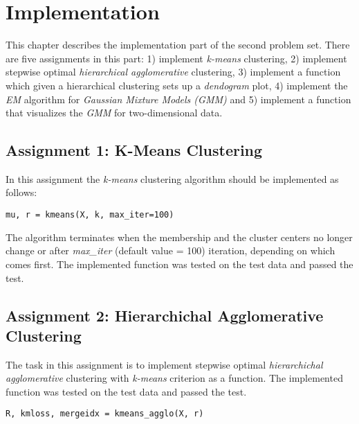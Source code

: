\chapter{Implementation}
\label{chap:implementation}

This chapter describes the implementation part of the second problem set. There are five assignments in this part: 1) implement \textit{k-means} clustering, 2) implement stepwise optimal \textit{hierarchical agglomerative} clustering, 3) implement a function which given a hierarchical clustering sets up a \textit{dendogram} plot, 4) implement the \textit{EM} algorithm for \textit{Gaussian Mixture Models (GMM)} and 5) implement a function that visualizes the \textit{GMM} for two-dimensional data.

\section{Assignment 1: K-Means Clustering}
\label{sec:assignment1}

In this assignment the \textit{k-means} clustering algorithm should be implemented as follows:

\begin{center}
\texttt{mu, r = kmeans(X, k, max\_iter=100)}
\end{center}

The algorithm terminates when the membership and the cluster centers no longer change or after \textit{max\_iter} (default value = 100) iteration, depending on which comes first. The implemented function was tested on the test data and passed the test.

\section{Assignment 2: Hierarchichal Agglomerative Clustering}
\label{sec:assignment2}

The task in this assignment is to implement stepwise optimal \textit{hierarchichal agglomerative} clustering with \textit{k-means} criterion as a function. The implemented function was tested on the test data and passed the test.

\begin{center}
\texttt{R, kmloss, mergeidx = kmeans\_agglo(X, r)}
\end{center}

